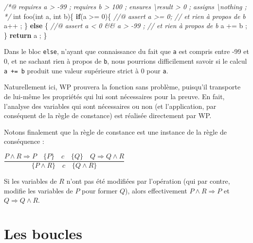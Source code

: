 \documentclass[12pt,francais,]{scrbook}
\newenvironment{Shaded}{}{}
\newcommand{\KeywordTok}[1]{\textcolor[rgb]{0.00,0.44,0.13}{\textbf{{#1}}}}
\newcommand{\DataTypeTok}[1]{\textcolor[rgb]{0.56,0.13,0.00}{{#1}}}
\newcommand{\DecValTok}[1]{\textcolor[rgb]{0.25,0.63,0.44}{{#1}}}
\newcommand{\CommentTok}[1]{\textcolor[rgb]{0.38,0.63,0.69}{\textit{{#1}}}}
\newcommand{\NormalTok}[1]{{#1}}
\begin{document}
\begin{footnotesize}\begin{Shaded}
\begin{Highlighting}[]
\CommentTok{/*@}
\CommentTok{  requires a > -99 ;}
\CommentTok{  requires b > 100 ;}
\CommentTok{  ensures  \textbackslash{}result > 0 ;}
\CommentTok{  assigns  \textbackslash{}nothing ;}
\CommentTok{*/}
\DataTypeTok{int} \NormalTok{foo(}\DataTypeTok{int} \NormalTok{a, }\DataTypeTok{int} \NormalTok{b)\{}
  \KeywordTok{if}\NormalTok{(a >= }\DecValTok{0}\NormalTok{)\{}
    \CommentTok{//@ assert a >= 0; // et rien à propos de b}
    \NormalTok{a++ ;}
  \NormalTok{\} }\KeywordTok{else} \NormalTok{\{}
    \CommentTok{//@ assert a < 0 && a > -99 ; // et rien à propos de b}
    \NormalTok{a += b ;}
  \NormalTok{\}}
  \KeywordTok{return} \NormalTok{a ;}
\NormalTok{\}}
\end{Highlighting}
\end{Shaded}\end{footnotesize}

Dans le bloc \texttt{else}, n'ayant que connaissance du fait que
\texttt{a} est compris entre -99 et 0, et ne sachant rien à propos de
\texttt{b}, nous pourrions difficilement savoir si le calcul
\texttt{a\ +=\ b} produit une valeur supérieure strict à 0 pour
\texttt{a}.

Naturellement ici, WP prouvera la fonction sans problème, puisqu'il
transporte de lui-même les propriétés qui lui sont nécessaires pour la
preuve. En fait, l'analyse des variables qui sont nécessaires ou non (et
l'application, par conséquent de la règle de constance) est réalisée
directement par WP.

Notons finalement que la règle de constance est une instance de la règle
de conséquence :

\begin{center}\(\dfrac{P \wedge R \Rightarrow P \quad \{P\}\quad c\quad \{Q\} \quad Q \Rightarrow Q \wedge R}{\{P \wedge R\}\quad c\quad \{Q \wedge R\}}\)
\end{center}

Si les variables de \(R\) n'ont pas été modifiées par l'opération (qui
par contre, modifie les variables de \(P\) pour former \(Q\)), alors
effectivement \(P \wedge R \Rightarrow P\) et
\(Q \Rightarrow Q \wedge R\).

\section{Les boucles}\label{les-boucles}
\end{document}
